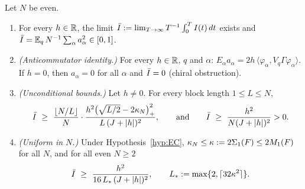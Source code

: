 \begin{theorem}\label{thm:imbalance}
Let $N$ be even.
\begin{enumerate}[label=(\roman*)]
\item For every $h\in\mathbb{R}$, the limit $\bar I:=\lim_{T\to\infty}T^{-1}\int_0^TI(t)\,dt$ exists and
$\bar I=\mathbb{E}_q\,N^{-1}\sum_\alpha a_\alpha^2\in[0,1]$.
\item \emph{(Anticommutator identity.)}  For every $h\in\mathbb{R}$, $q$ and $\alpha$:
$E_\alpha a_\alpha=2h\,\langle\varphi_\alpha,V_q\Gamma\varphi_\alpha\rangle$.  If $h=0$, then $a_\alpha=0$ for all
$\alpha$ and $\bar I=0$ (chiral obstruction).
\item \emph{(Unconditional bounds.)}  Let $h\neq0$.  For every block length $1\le L\le N$,
\begin{equation}\label{eq:main-Ibound}
  \bar I\ \ge\ \frac{\lfloor N/L\rfloor}{N}\cdot\frac{h^2\bigl(\sqrt{L/2}-2\kappa_N\bigr)_+^2}{L\,(J+|h|)^2},
  \qquad\text{and}\qquad \bar I\ \ge\ \frac{h^2}{N(J+|h|)^2}>0 .
\end{equation}
\item \emph{(Uniform in $N$.)}  Under Hypothesis~\ref{hyp:EC}, $\kappa_N\le\kappa:=2\Sigma_1(F)\le2M_1(F)$ for all
$N$, and for all even $N\ge2$
\begin{equation}\label{eq:main-Iuniform}
  \bar I\ \ge\ \frac{h^2}{16\,L_*\,(J+|h|)^2},\qquad L_*:=\max\{2,\lceil32\kappa^2\rceil\}.
\end{equation}
\end{enumerate}
\end{theorem}

